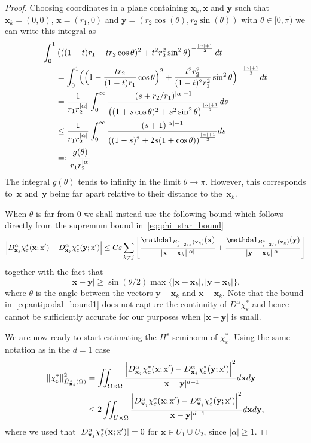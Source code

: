\documentclass[10pt]{amsart}
\theoremstyle{definition}\newtheorem{defi}[theo]{Definition}\newtheorem{rema}[theo]{Remark}\newtheorem{exam}[theo]{Example}\newtheorem{exem}[theo]{Example}\newtheorem{nota}[theo]{Notation}
\newcommand*\eps{\varepsilon}
\newcommand\1{{\ensuremath {\mathds 1} }}
\newcommand{\bx}{\mathbf{x}}
\newcommand{\by}{\mathbf{y}}
\newcommand{\sx}{\textup{x}}
\begin{document}
\begin{proof}
Choosing coordinates in a plane containing $\bx_k, \bx$ and $\by$ such that $\bx_k=(0, 0)$, $\bx=(r_1, 0)$ and $\by=(r_2\cos(\theta), r_2 \sin(\theta))$ with $\theta \in [0, \pi)$ we can write this integral as
\begin{align*}
\int_0^1 &\left(((1-t)r_1-t r_2\cos\theta)^2+t^2r_2^2\sin^2\theta\right)^{-\frac{|\alpha|+1}{2}}dt\\
&=
\int_0^1 \Bigl(\Bigl(1-\frac{t r_2}{(1-t)r_1}\cos\theta\Bigr)^2+\frac{t^2r_2^2}{(1-t)^2r_1^2}\sin^2\theta\Bigr)^{-\frac{|\alpha|+1}{2}}dt\\
&=
\frac{1}{r_1 r_2^{|\alpha|}}\int_0^\infty \frac{(s+r_2/r_1)^{|\alpha|-1}}{\left((1+s \cos\theta)^2+s^2\sin^2\theta\right)^{\frac{|\alpha|+1}{2}}}ds\\
&\leq
\frac{1}{r_1 r_2^{|\alpha|}}\int_0^\infty \frac{(s+1)^{|\alpha|-1}}{\left((1-s)^2+2s(1+\cos\theta)\right)^{\frac{|\alpha|+1}{2}}}ds\\
&=:
\frac{g(\theta)}{r_1 r_2^{|\alpha|}}
\end{align*}
The integral $g(\theta)$ tends to infinity in the limit $\theta\to \pi$. However, this corresponds to~$\bx$ and~$\by$ being far apart relative to their distance to the~$\bx_k$.

When $\theta$ is far from $0$ we shall instead use the following bound which follows directly from the supremum bound in~\eqref{eq:phi_star_bound}
\begin{equation}\label{eq:antipodal_bound1}
\left|D_{\bx_j}^\alpha \chi_\eps^*(\bx; \sx')- D_{\bx_j}^\alpha \chi_\eps^*(\by; \sx')\right|
\leq C \eps \sum_{k\neq j}\left[\frac{\1_{B_{e^{-2/\eps}}^c(\bx_k)}(\bx)}{|\bx-\bx_k|^{|\alpha|}}+\frac{\1_{B_{e^{-2/\eps}}^c(\bx_k)}(\by)}{|\by-\bx_k|^{|\alpha|}}\right]
\end{equation}
together with the fact that
\begin{equation}\label{eq:antipodal_bound2}
|\bx- \by| \geq \sin(\theta/2)\max\{|\bx-\bx_k|, |\by-\bx_k|\},
\end{equation}
where $\theta$ is the angle between the vectors $\by-\bx_k$ and $\bx-\bx_k.$ Note that the bound in~\eqref{eq:antipodal_bound1} does not capture the continuity of $D^\alpha\chi_\eps^*$ and hence cannot be sufficiently accurate for our purposes when $|\bx-\by|$ is small.



We are now ready to start estimating the $H^s$-seminorm of $\chi_\eps^*$. Using the same notation as in the $d=1$ case
\begin{align*}
\|\chi_\eps^*\|_{\dot H^s_{\bx_j}(\Omega)}^2 &=
\iint_{\Omega\times \Omega}\frac{\left|D_{\bx_j}^\alpha\chi_\eps^*(\bx; \sx')-D_{\bx_j}^\alpha\chi_\eps^*(\by; \sx')\right|^2}{|\bx-\by|^{d+1}}d\bx d\by\\
&\leq 2\iint_{U\times \Omega}\frac{\left|D_{\bx_j}^\alpha\chi_\eps^*(\bx; \sx')-D_{\bx_j}^\alpha\chi_\eps^*(\by; \sx')\right|^2}{|\bx-\by|^{d+1}}d\bx d\by,
\end{align*}
where we used that $|D_{\bx_j}^\alpha \chi_\eps^*(\bx; \sx')|=0$ for $\bx \in U_1 \cup U_2$, since $|\alpha|\geq 1$.



\end{proof}
\end{document}
